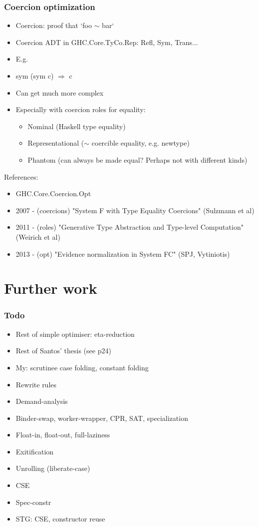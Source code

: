 \documentclass[aspectratio=169]{beamer}
\begin{document}
\begin{frame}
  \frametitle{Coercion optimization}
  \begin{itemize}
    \item Coercion: proof that `foo $\sim$ bar`
    \item Coercion ADT in GHC.Core.TyCo.Rep: Refl, Sym, Trans...
    \item E.g. \item sym (sym c) $\Longrightarrow$ c
    \item Can get much more complex
    \item Especially with coercion roles for equality:
      \begin{itemize}
        \item Nominal (Haskell type equality)
        \item Representational ($\sim$ coercible equality, e.g. newtype)
        \item Phantom (can always be made equal? Perhaps not with different kinds)
      \end{itemize}
  \end{itemize}

  References:
  \begin{itemize}
    \item GHC.Core.Coercion.Opt
    \item 2007 - (coercions) "System F with Type Equality Coercions" (Sulzmann
      et al)
    \item 2011 - (roles) "Generative Type Abstraction and Type-level Computation" (Weirich et al)
    \item 2013 - (opt) "Evidence normalization in System FC" (SPJ, Vytiniotis)
  \end{itemize}
\end{frame}

\section{Further work}

\begin{frame}
  \frametitle{Todo}

  \begin{itemize}
    \item Rest of simple optimiser: eta-reduction
    \item Rest of Santos' thesis (see p24)
    \item My: scrutinee case folding, constant folding
    \item Rewrite rules
    \item Demand-analysis
    \item Binder-swap, worker-wrapper, CPR, SAT, specialization
    \item Float-in, float-out, full-laziness
    \item Exitification
    \item Unrolling (liberate-case)
    \item CSE
    \item Spec-constr
    \item STG: CSE, constructor reuse
  \end{itemize}

\end{frame}
\end{document}
